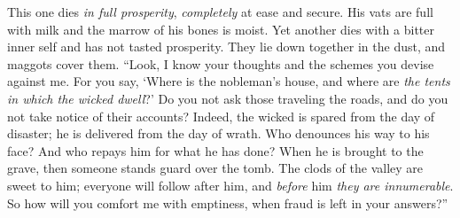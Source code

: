 \begin{biblechapter}
\verse This one dies \textit{in full prosperity}, 
\textit{completely} at ease and secure.
\verse His vats are full with milk 
and the marrow of his bones is moist.
\verse Yet another dies with a bitter inner self 
and has not tasted prosperity.
\verse They lie down together in the dust, 
and maggots cover them.
\verse “Look, I know your thoughts 
and the schemes you devise against me.
\verse For you say, ‘Where is the nobleman’s house, 
and where are \textit{the tents in which the wicked dwell}?’
\verse Do you not ask those traveling the roads, 
and do you not take notice of their accounts?
\verse Indeed, the wicked is spared from the day of disaster; 
he is delivered from the day of wrath.
\verse Who denounces his way to his face? 
And who repays him for what he has done?
\verse When he is brought to the grave, 
then someone stands guard over the tomb.
\verse The clods of the valley are sweet to him; 
everyone will follow after him, 
and \textit{before} him \textit{they are innumerable}.
\verse So how will you comfort me with emptiness, 
when fraud is left in your answers?”
\end{biblechapter}

